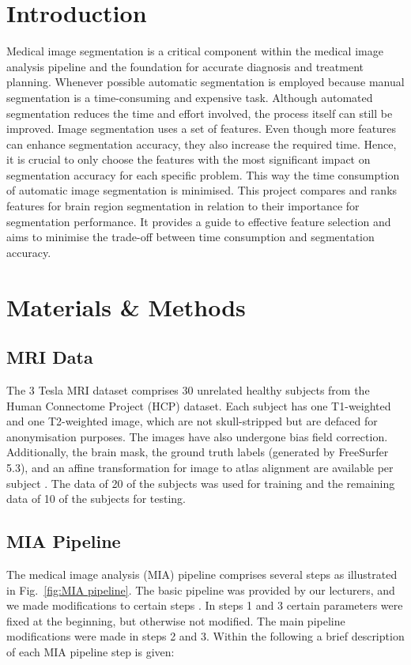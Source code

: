 \documentclass[conference]{IEEEtran}
\begin{document}
\section{Introduction} \label{sec:Introduction}
Medical image segmentation is a critical component within the medical image analysis pipeline and the foundation for accurate diagnosis and treatment planning. Whenever possible automatic segmentation is employed because manual segmentation is a time-consuming and expensive task. Although automated segmentation reduces the time and effort involved, the process itself can still be improved. Image segmentation uses a set of features. Even though more features can enhance segmentation accuracy, they also increase the required time. Hence, it is crucial to only choose the features with the most significant impact on segmentation accuracy for each specific problem. This way the time consumption of automatic image segmentation is minimised. This project compares and ranks features for brain region segmentation in relation to their importance for segmentation performance. It provides a guide to effective feature selection and aims to minimise the trade-off between time consumption and segmentation accuracy. \cite{Intro}


\section{Materials \& Methods} \label{sec:Materials \& Methods}
\subsection{MRI Data} \label{subsec:MRI Data}
The 3 Tesla MRI dataset comprises 30 unrelated healthy subjects from the Human Connectome Project (HCP) dataset. Each subject has one T1-weighted and one T2-weighted image, which are not skull-stripped but are defaced for anonymisation purposes. The images have also undergone bias field correction. Additionally, the brain mask, the ground truth labels (generated by FreeSurfer 5.3), and an affine transformation for image to atlas alignment are available per subject \cite{MIA Doc}. The data of 20 of the subjects was used for training and the remaining data of 10 of the subjects for testing.

\subsection{MIA Pipeline} \label{subsec:MIA Pipeline}
The medical image analysis (MIA) pipeline comprises several steps as illustrated in Fig.~\ref{fig:MIA pipeline}. The basic pipeline was provided by our lecturers, and we made modifications to certain steps \cite{MIA Repo}. In steps 1 and 3 certain parameters were fixed at the beginning, but otherwise not modified. The main pipeline modifications were made in steps 2 and 3. Within the following a brief description of each MIA pipeline step is given:
\end{document}
